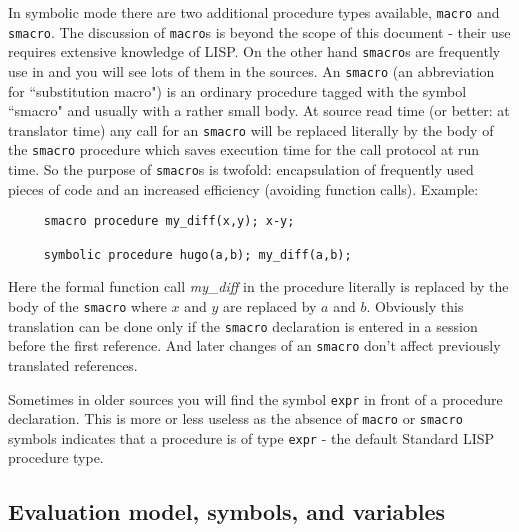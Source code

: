 In symbolic mode there are two additional procedure types
available, {\tt macro}  and {\tt smacro}. 
The discussion of {\tt macro}s is beyond the scope of
this document - their use requires extensive knowledge of
LISP. On the other hand {\tt smacro}s are frequently use
in {\reduce} and you will see lots of them in the sources.
An {\tt smacro} (an abbreviation for ``substitution macro")
is an ordinary procedure tagged with
the symbol ``smacro" and usually with a rather small body.
At source read time (or better: at {\reduce} translator
time) any call for an {\tt smacro} will be replaced
literally by the body of the {\tt smacro} procedure
which saves execution time for the call protocol at
run time. So the purpose of {\tt smacro}s is twofold:
encapsulation of frequently used pieces of code and
an increased efficiency (avoiding function calls).
Example:
\begin{verbatim}
     smacro procedure my_diff(x,y); x-y;

     symbolic procedure hugo(a,b); my_diff(a,b);
\end{verbatim}
Here the formal function call {\em my\_diff} in the
procedure literally is replaced by the body of the
{\tt smacro} where $x$ and $y$ are replaced by $a$ and
$b$. Obviously this translation can be done only if
the {\tt smacro} declaration is entered in a {\reduce}
session before the first reference. And later changes
of an {\tt smacro} don't affect previously translated
references.

Sometimes in older {\reduce} sources you will find
the symbol {\tt expr} in front of a procedure declaration.
This is more or less useless as the absence of {\tt macro}
or {\tt smacro} symbols indicates that a procedure is
of type {\tt expr} - the default Standard LISP procedure type.


\subsection{Evaluation model, symbols, and variables}

